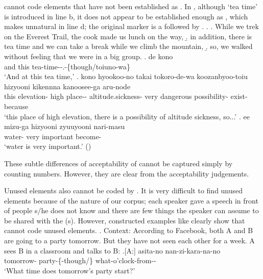 cannot code elements that have not been established as .
In \Next,
although `tea time' is introduced in line b,
it does not appear to be established enough as ,
which makes  unnatural in line d;
the original marker is a  followed by .
%
\ex.\label{thii-taimu}
 \a. While we trek on the Everest Trail, the cook made us lunch on the way,
 \b. in addition, there is tea time and we can take a break while we climb the mountain,
 \b. so, we walked without feeling that we were in a big group.
 \bg. de kono  \\
		and this tea-time--.-\{though/toiuno-wa\} \\
		`And at this tea time,'
 \bg. kono hyookoo-no {takai} {tokoro-de-wa} koozanbyoo-toiu hizyooni {kikennna} {kanoosee-ga} aru-node \\
		this elevation- high place-- altitude.sickness- very dangerous possibility- exist-because \\
		`this place of high elevation, there is a possibility of altitude sickness, so...'
 \bg. ee {mizu-ga} hizyooni zyuuyooni nari-masu \\
		 water- very important become- \\
		`water is very important.'
		 \hfill{()}

These subtle differences of acceptability of  cannot be captured simply by counting numbers.
However, they are clear from the acceptability judgements.

Unused elements also cannot be coded by .
It is very difficult to find unused elements
because of the nature of our corpus;
each speaker gave a speech in front of people s/he does not know
and there are few things the speaker can assume to be shared with the (s).
However, constructed examples like \Next clearly show that  cannot code unused elements.
%
\ex. \label{FacebookParty}Context: According to Facebook, both A and B are going to a party tomorrow. But they have not seen each other for a week. A sees B in a classroom and talks to B:
	\a.[A:] asita-no  nan-zi-kara-na-no \\
		tomorrow- party-\{-though/\} what-o'clock-from-- \\
		`What time does tomorrow's party start?' 

